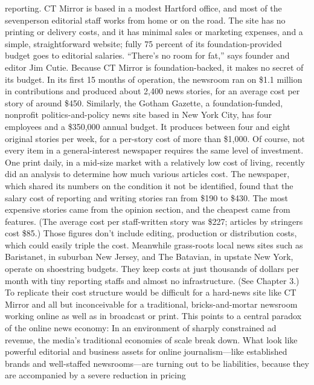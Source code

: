 reporting. CT Mirror is based in a modest Hartford office, and most of the sevenperson
editorial staff works from home or on the road. The site has no printing
or delivery costs, and it has minimal sales or marketing expenses, and a simple,
straightforward website; fully 75 percent of its foundation-provided budget goes
to editorial salaries. ``There’s no room for fat,'' says founder and editor Jim Cutie.
Because CT Mirror is foundation-backed, it makes no secret of its budget.
In its first 15 months of operation, the newsroom ran on \$1.1 million in contributions
and produced about 2,400 news stories, for an average cost per story
of around \$450. Similarly, the Gotham Gazette, a foundation-funded, nonprofit
politics-and-policy news site based in New York City, has four employees and a
\$350,000 annual budget. It produces between four and eight original stories per
week, for a per-story cost of more than \$1,000.
Of course, not every item in a general-interest newspaper requires the same
level of investment. One print daily, in a mid-size market with a relatively low
cost of living, recently did an analysis to determine how much various articles
cost. The newspaper, which shared its numbers on the condition it not be identified,
found that the salary cost of reporting and writing stories ran from \$190
to \$430. The most expensive stories came from the opinion section, and the
cheapest came from features. (The average cost per staff-written story was \$227;
articles by stringers cost \$85.) Those figures don’t include editing, production or
distribution costs, which could easily triple the cost.
Meanwhile grass-roots local news sites such as Baristanet, in suburban New
Jersey, and The Batavian, in upstate New York, operate on shoestring budgets.
They keep costs at just thousands of dollars per month with tiny reporting staffs
and almost no infrastructure. (See Chapter 3.) To replicate their cost structure
would be difficult for a hard-news site like CT Mirror and all but inconceivable
for a traditional, bricks-and-mortar newsroom working online as well as in
broadcast or print.
This points to a central paradox of the online news economy: In an environment
of sharply constrained ad revenue, the media’s traditional economies of
scale break down. What look like powerful editorial and business assets for online
journalism—like established brands and well-staffed newsrooms—are turning
out to be liabilities, because they are accompanied by a severe reduction in pricing

